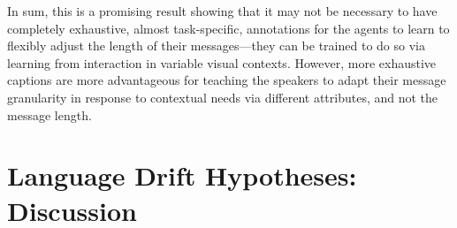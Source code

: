 In sum, this is a promising result showing that it may not be necessary to have completely exhaustive, almost task-specific, annotations for the agents to learn to flexibly adjust the length of their messages---they can be trained to do so via learning from interaction in variable visual contexts. However, more exhaustive captions are more advantageous for teaching the speakers to adapt their message granularity in response to contextual needs via different attributes, and not the message length.


\section{Language Drift Hypotheses: Discussion}

